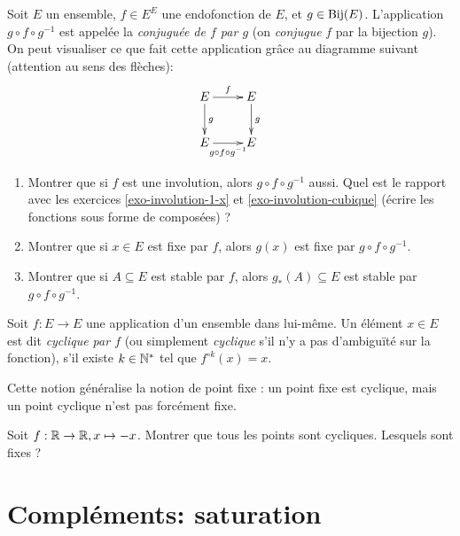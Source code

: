 \begin{exercice}
\label{exo-conjugaison}
Soit $E$ un ensemble, $f \in E^E$ une endofonction de $E$, et $g \in \operatorname{Bij}(E)$. L'application $g\circ f \circ g^{-1}$ est appelée la \emph{conjuguée de $f$ par $g$} (on \emph{conjugue} $f$ par la bijection $g$). On peut visualiser ce que fait cette application grâce au diagramme suivant (attention au sens des flèches):
\[\xymatrix{
E \ar[d]^g \ar[r]^f & E \ar[d]^g\\
E \ar[r]_{g\circ f\circ g^{-1}}& E
}\]
\begin{enumerate}
\item Montrer que si $f$ est une involution, alors $g\circ f \circ g^{-1}$ aussi. Quel est le rapport avec les exercices \ref{exo-involution-1-x} et \ref{exo-involution-cubique} (écrire les fonctions sous forme de composées) ?
\item Montrer que si $x\in E$ est fixe par $f$, alors $g(x)$ est fixe par $g\circ f \circ g^{-1}$.
\item Montrer que si $A \subseteq E$ est stable par $f$, alors $g_*(A) \subseteq E$ est stable par $g\circ f \circ g^{-1}$.
\end{enumerate}
\end{exercice}

\begin{definition}\label{def-point-cyclique}
Soit $f : E\to E$ une application d'un ensemble dans lui-même. Un élément $x\in E$ est dit \emph{cyclique par $f$} (ou simplement \emph{cyclique} s'il n'y a pas d'ambiguïté sur la fonction), s'il existe $k\in\mathbb{N}^*$ tel que $f^{\circ k}(x)=x$. 
\end{definition}

Cette notion généralise la notion de point fixe : un point fixe est cyclique, mais un point cyclique n'est pas forcément fixe.

\begin{exercice}
Soit $f : \mathbb{R}\to \mathbb{R}, x\mapsto -x$. Montrer que tous les points sont cycliques. Lesquels sont fixes ?
\end{exercice}



\section{Compléments: saturation}


